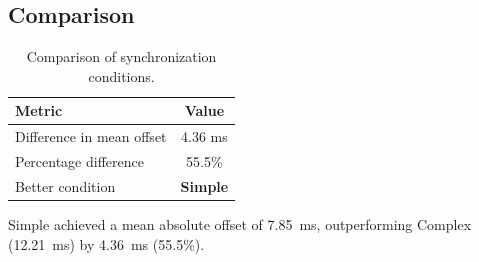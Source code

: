 \subsection*{Comparison}

\begin{table}[h!]
\centering
\begin{tabular}{|l|c|}
\hline
Metric & Value \\
\hline
Difference in mean offset & 4.36 ms \\
Percentage difference & 55.5\% \\
Better condition & \textbf{Simple} \\
\hline
\end{tabular}
\caption{Comparison of synchronization conditions.}
\label{tab:sync_comparison}
\end{table}

Simple achieved a mean absolute offset of 7.85~ms, outperforming Complex (12.21~ms) by 4.36~ms (55.5\%).
